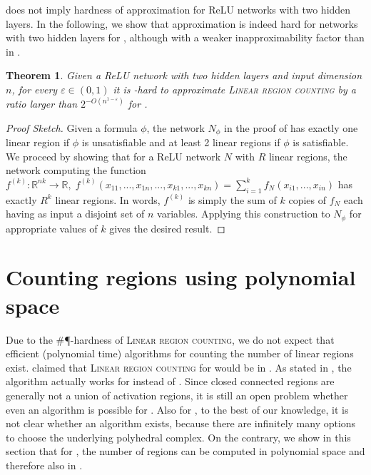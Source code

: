 \documentclass{article}
\newtheorem{theorem}{Theorem}[section]
\begin{document}
 does not imply hardness of approximation for ReLU networks with two hidden layers.
In the following, we show that approximation is indeed hard for networks with two hidden layers for , although with a weaker inapproximability factor than in .
\begin{theorem}
\label{thm:approx_result_2_hidden_layers}
Given a ReLU network with two hidden layers and input dimension $n$, for every $\varepsilon \in (0,1)$ it is \NP-hard to approximate \textsc{Linear region counting} by a ratio larger than $2^{-O(n^{1-\varepsilon})}$ for .
\end{theorem}
\begin{proof}[Proof Sketch]
Given a \SAT{} formula $\phi$, the network $N_\phi$ in the proof of  has exactly one linear region if $\phi$ is unsatisfiable and at least 2 linear regions if $\phi$ is satisfiable.
We proceed by showing that for a ReLU network $N$ with $R$ linear regions, the network computing the function $f^{(k)}:\mathbb{R}^{nk}\to \mathbb{R},\; f^{(k)}(x_{11},...,x_{1n},...,x_{k1},...,x_{kn})=\sum_{i=1}^kf_{N}(x_{i1},...,x_{in})$
has exactly $R^k$ linear regions.
In words, $f^{(k)}$ is simply the sum of $k$ copies of $f_N$ each having as input a disjoint set of $n$ variables.
Applying this construction to $N_\phi$ for appropriate values of $k$ gives the desired result.
\end{proof}

\section{Counting regions using polynomial space}\label{sec:pspace}
Due to the \#\P-hardness of \textsc{Linear region counting}, we do not expect that efficient (polynomial time) algorithms for counting the number of linear regions exist.
\citet{wang2022estimation} claimed that \textsc{Linear region counting} for  would be in \EXP\TIME. As stated in , the algorithm actually works for  instead of . Since closed connected regions are generally not a union of activation regions, it is still an open problem whether even an \EXP\TIME{} algorithm is possible for . Also for , to the best of our knowledge, it is not clear whether an \EXP\TIME{} algorithm exists, because there are infinitely many options to choose the underlying polyhedral complex.
On the contrary, we show in this section that for , the number of regions can be computed in polynomial space and therefore also in \EXP\TIME{}.
\end{document}
